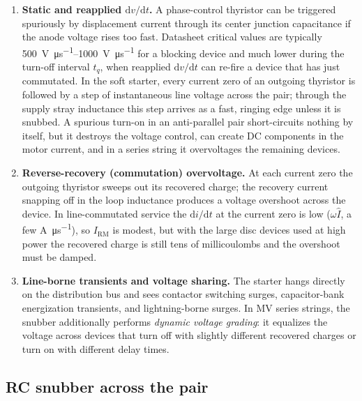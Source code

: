 \begin{enumerate}
  \item \textbf{Static and reapplied $\mathrm{d}v/\mathrm{d}t$.} A
        phase-control thyristor can be triggered spuriously by displacement
        current through its center junction capacitance if the anode voltage
        rises too fast. Datasheet critical values are typically
        \SIrange{500}{1000}{\volt\per\micro\second} for a blocking device
        and much lower during the turn-off interval $t_q$, when reapplied
        $\mathrm{d}v/\mathrm{d}t$ can re-fire a device that has just
        commutated. In the soft starter, every current zero of an outgoing
        thyristor is followed by a step of instantaneous line voltage across
        the pair; through the supply stray inductance this step arrives as a
        fast, ringing edge unless it is snubbed. A spurious turn-on in an
        anti-parallel pair short-circuits nothing by itself, but it destroys
        the voltage control, can create DC components in the motor current,
        and in a series string it overvoltages the remaining devices.
  \item \textbf{Reverse-recovery (commutation) overvoltage.} At each current
        zero the outgoing thyristor sweeps out its recovered charge; the
        recovery current snapping off in the loop inductance produces a
        voltage overshoot across the device. In line-commutated service the
        $\mathrm{d}i/\mathrm{d}t$ at the current zero is low
        ($\omega \hat{I}$, a few \si{\ampere\per\micro\second}), so
        $I_\mathrm{RM}$ is modest, but with the large disc devices used at
        high power the recovered charge is still tens of millicoulombs and
        the overshoot must be damped.
  \item \textbf{Line-borne transients and voltage sharing.} The starter
        hangs directly on the distribution bus and sees contactor switching
        surges, capacitor-bank energization transients, and lightning-borne
        surges. In MV series strings, the snubber additionally performs
        \emph{dynamic voltage grading}: it equalizes the voltage across
        devices that turn off with slightly different recovered charges or
        turn on with different delay times.
\end{enumerate}

\subsection{RC snubber across the pair}

